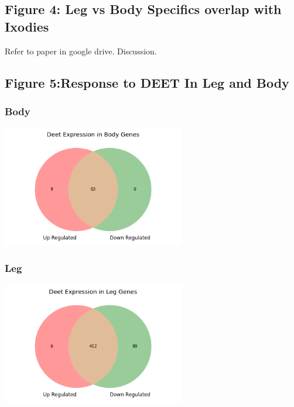\documentclass[11pt]{article}
\begin{document}
\subsection{Figure 4: Leg vs Body Specifics overlap with Ixodies}
\label{sec:org001c7de}
Refer to paper in google drive. Discussion.
\subsection{Figure 5:Response to DEET In Leg and Body}
\label{sec:org5268e66}
\subsubsection{Body}
\label{sec:orgce98a64}
\begin{center}
\includegraphics[width=0.6\textwidth]{figure5/DeetBodyDeseq.png}
\end{center}
\subsubsection{Leg}
\label{sec:orgce0e1d8}
\begin{center}
\includegraphics[width=0.6\textwidth]{figure5/DeetLegDeseq.png}
\end{center}
\end{document}
